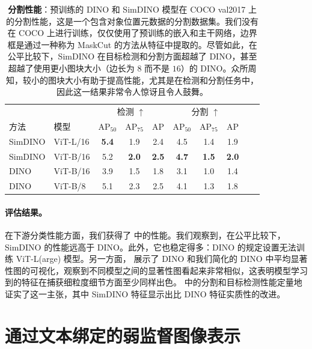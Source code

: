 \documentclass[../../book-main_zh.tex]{subfiles}
\begin{document}
\begin{table}
\caption{\small\textbf{分割性能}：预训练的 DINO 和 SimDINO 模型在 COCO val2017 \citep{lin2014microsoft} 上的分割性能，这是一个包含对象位置元数据的分割数据集。我们没有在 COCO 上进行训练，仅仅使用了预训练的嵌入和主干网络，边界框是通过一种称为 MaskCut \citep{wang2023cut} 的方法从特征中提取的。尽管如此，在公平比较下，SimDINO 在目标检测和分割方面超越了 DINO，甚至超越了使用更小图块大小（边长为 \(8\) 而不是 \(16\)）的 DINO。众所周知，较小的图块大小有助于提高性能，尤其是在检测和分割任务中，因此这一结果非常令人惊讶且令人鼓舞。}
\centering
\begin{tabular}{@{}llcccccccc@{}}
    \toprule
    &  & \multicolumn{3}{c}{检测 $\uparrow$} &
    \multicolumn{3}{c}{分割 $\uparrow$} \\
    方法 & 模型 & AP$_{50}$  & AP$_{75}$ & AP & AP$_{50}$ &
    AP$_{75}$ & AP  \\
    \midrule
    SimDINO &ViT-L/16 &\bf 5.4 &1.9 &2.4 &4.5 &1.4 &1.9 \\
    SimDINO &ViT-B/16 &5.2 & \bf 2.0 & \bf 2.5 & \bf4.7 & \bf 1.5 & \bf 2.0 \\
    DINO &ViT-B/16 &3.9 &1.5 &1.8 &3.1 &1.0 &1.4 \\
    \midrule
    \color{gray} DINO & \color{gray} ViT-B/8 & \color{gray}5.1 &
    \color{gray}2.3 & \color{gray}2.5 & \color{gray}4.1 &
    \color{gray}1.3 & \color{gray}1.8 \\
    \bottomrule
\end{tabular}
\label{tab:dino_segmentation}
\end{table}

\paragraph{评估结果。} 在下游分类性能方面，我们获得了  中的性能。我们观察到，在公平比较下，SimDINO 的性能远高于 DINO。此外，它也稳定得多：DINO 的规定设置无法训练 ViT-L(arge) 模型。另一方面， 展示了 DINO 和我们简化的 DINO 中平均显著性图的可视化，观察到不同模型之间的显著性图看起来非常相似，这表明模型学习到的特征在捕获细粒度细节方面至少同样出色。 中的分割和目标检测性能定量地证实了这一主张，其中 SimDINO 特征显示出比 DINO 特征实质性的改进。

\section{通过文本绑定的弱监督图像表示}\label{sec:CLIP}
\end{document}
